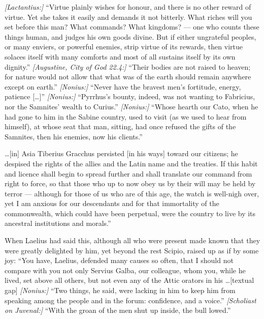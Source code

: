  \textit{[Lactantius:]} ``Virtue plainly wishes for honour, and there is no other reward of virtue. Yet she takes it easily and demands it not bitterly. What riches will you set before this man? What commands? What kingdoms? --- one who counts these things human, and judges his own goods divine. But if either ungrateful peoples, or many enviers, or powerful enemies, strip virtue of its rewards, then virtue solaces itself with many comforts and most of all sustains itself by its own dignity.'' \textit{[Augustine, City of God 22.4:]} ``Their bodies are not raised to heaven; for nature would not allow that what was of the earth should remain anywhere except on earth.'' \textit{[Nonius:]} ``Never have the bravest men's fortitude, energy, patience [\ldots]'' \textit{[Nonius:]} ``Pyrrhus's bounty, indeed, was not wanting to Fabricius, nor the Samnites' wealth to Curius.'' \textit{[Nonius:]} ``Whose hearth our Cato, when he had gone to him in the Sabine country, used to visit (as we used to hear from himself), at whose seat that man, sitting, had once refused the gifts of the Samnites, then his enemies, now his clients.''

 \ldots [in] Asia Tiberius Gracchus persisted [in his ways] toward our citizens; he despised the rights of the allies and the Latin name and the treaties. If this habit and licence shall begin to spread further and shall translate our command from right to force, so that those who up to now obey us by their will may be held by terror --- although for those of us who are of this age, the watch is well-nigh over, yet I am anxious for our descendants and for that immortality of the commonwealth, which could have been perpetual, were the country to live by its ancestral institutions and morals.''

 When Laelius had said this, although all who were present made known that they were greatly delighted by him, yet beyond the rest Scipio, raised up as if by some joy: ``You have, Laelius, defended many causes so often, that I should not compare with you not only Servius Galba, our colleague, whom you, while he lived, set above all others, but not even any of the Attic orators in his \ldots [textual gap] \textit{[Nonius:]} ``Two things, he said, were lacking in him to keep him from speaking among the people and in the forum: confidence, and a voice.'' \textit{[Scholiast on Juvenal:]} ``With the groan of the men shut up inside, the bull lowed.''

